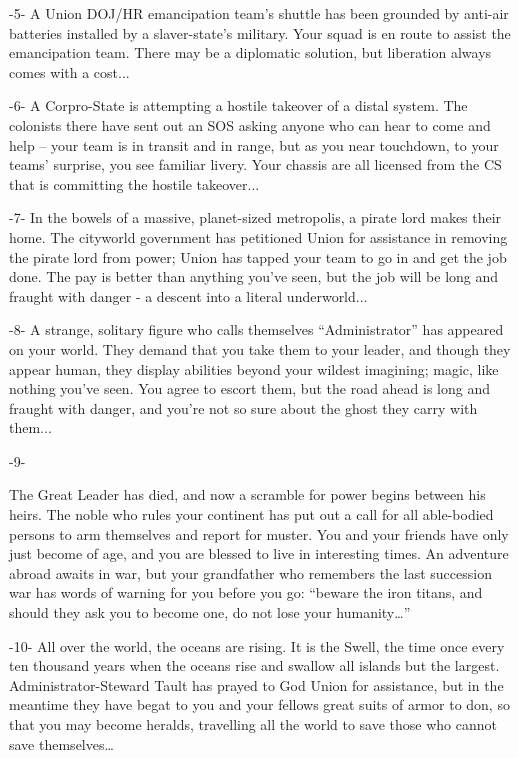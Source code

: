                                                      -5-
A Union DOJ/HR emancipation team’s shuttle has been grounded by anti-air batteries installed by
a slaver-state’s military. Your squad is en route to assist the emancipation team. There may be a
diplomatic solution, but liberation always comes with a cost...

                                                     -6-
A Corpro-State is attempting a hostile takeover of a distal system. The colonists there have sent
out an SOS asking anyone who can hear to come and help -- your team is in transit and in range,
but as you near touchdown, to your teams’ surprise, you see familiar livery. Your chassis are all
licensed from the CS that is committing the hostile takeover...

                                                     -7-
In the bowels of a massive, planet-sized metropolis, a pirate lord makes their home. The cityworld
government has petitioned Union for assistance in removing the pirate lord from power; Union
has tapped your team to go in and get the job done. The pay is better than anything you’ve seen,
but the job will be long and fraught with danger - a descent into a literal underworld...

                                                     -8-
A strange, solitary figure who calls themselves ``Administrator'' has appeared on your world. They
demand that you take them to your leader, and though they appear human, they display abilities
beyond your wildest imagining; magic, like nothing you’ve seen. You agree to escort them, but
the road ahead is long and fraught with danger, and you’re not so sure about the ghost they carry
with them...

                                                     -9-




The Great Leader has died, and now a scramble for power begins between his heirs. The noble
who rules your continent has put out a call for all able-bodied persons to arm themselves and
report for muster. You and your friends have only just become of age, and you are blessed to live
in interesting times. An adventure abroad awaits in war, but your grandfather who remembers the
last succession war has words of warning for you before you go: ``beware the iron titans, and
should they ask you to become one, do not lose your humanity…''

                                                        -10-
All over the world, the oceans are rising. It is the Swell, the time once every ten thousand years
when the oceans rise and swallow all islands but the largest. Administrator-Steward Tault has
prayed to God Union for assistance, but in the meantime they have begat to you and your fellows
great suits of armor to don, so that you may become heralds, travelling all the world to save those
who cannot save themselves…

